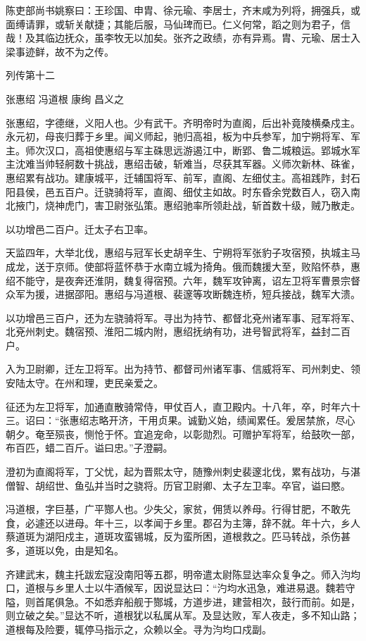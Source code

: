 \documentclass[12pt,UTF8]{ctexbook}
\begin{document}
陈吏部尚书姚察曰：王珍国、申胄、徐元瑜、李居士，齐末咸为列将，拥强兵，或面缚请罪，或斩关献捷；其能后服，马仙琕而已。仁义何常，蹈之则为君子，信哉！及其临边抚众，虽李牧无以加矣。张齐之政绩，亦有异焉。胄、元瑜、居士入梁事迹鲜，故不为之传。





列传第十二

张惠绍 冯道根 康绚 昌义之

张惠绍，字德继，义阳人也。少有武干。齐明帝时为直阁，后出补竟陵横桑戍主。永元初，母丧归葬于乡里。闻义师起，驰归高祖，板为中兵参军，加宁朔将军、军主。师次汉口，高祖使惠绍与军主硃思远游遏江中，断郢、鲁二城粮运。郢城水军主沈难当帅轻舸数十挑战，惠绍击破，斩难当，尽获其军器。义师次新林、硃雀，惠绍累有战功。建康城平，迁辅国将军、前军，直阁、左细仗主。高祖践阼，封石阳县侯，邑五百户。迁骁骑将军，直阁、细仗主如故。时东昏余党数百人，窃入南北掖门，烧神虎门，害卫尉张弘策。惠绍驰率所领赴战，斩首数十级，贼乃散走。

以功增邑二百户。迁太子右卫率。

天监四年，大举北伐，惠绍与冠军长史胡辛生、宁朔将军张豹子攻宿预，执城主马成龙，送于京师。使部将蓝怀恭于水南立城为掎角。俄而魏援大至，败陷怀恭，惠绍不能守，是夜奔还淮阴，魏复得宿预。六年，魏军攻钟离，诏左卫将军曹景宗督众军为援，进据邵阳。惠绍与冯道根、裴邃等攻断魏连桥，短兵接战，魏军大溃。

以功增邑三百户，还为左骁骑将军。寻出为持节、都督北兗州诸军事、冠军将军、北兗州刺史。魏宿预、淮阳二城内附，惠绍抚纳有功，进号智武将军，益封二百户。

入为卫尉卿，迁左卫将军。出为持节、都督司州诸军事、信威将军、司州刺史、领安陆太守。在州和理，吏民亲爱之。

征还为左卫将军，加通直散骑常侍，甲仗百人，直卫殿内。十八年，卒，时年六十三。诏曰：“张惠绍志略开济，干用贞果。诚勤义始，绩闻累任。爰居禁旅，尽心朝夕。奄至殒丧，恻怆于怀。宜追宠命，以彰勋烈。可赠护军将军，给鼓吹一部，布百匹，蜡二百斤。谥曰忠。”子澄嗣。

澄初为直阁将军，丁父忧，起为晋熙太守，随豫州刺史裴邃北伐，累有战功，与湛僧智、胡绍世、鱼弘并当时之骁将。历官卫尉卿、太子左卫率。卒官，谥曰愍。

冯道根，字巨基，广平酂人也。少失父，家贫，佣赁以养母。行得甘肥，不敢先食，必遽还以进母。年十三，以孝闻于乡里。郡召为主簿，辞不就。年十六，乡人蔡道斑为湖阳戍主，道斑攻蛮锡城，反为蛮所困，道根救之。匹马转战，杀伤甚多，道斑以免，由是知名。

齐建武末，魏主托跋宏寇没南阳等五郡，明帝遣太尉陈显达率众复争之。师入汮均口，道根与乡里人士以牛酒候军，因说显达曰：“汋均水迅急，难进易退。魏若守隘，则首尾俱急。不如悉弃船舰于酂城，方道步进，建营相次，鼓行而前。如是，则立破之矣。”显达不听，道根犹以私属从军。及显达败，军人夜走，多不知山路；道根每及险要，辄停马指示之，众赖以全。寻为汮均口戍副。
\end{document}
